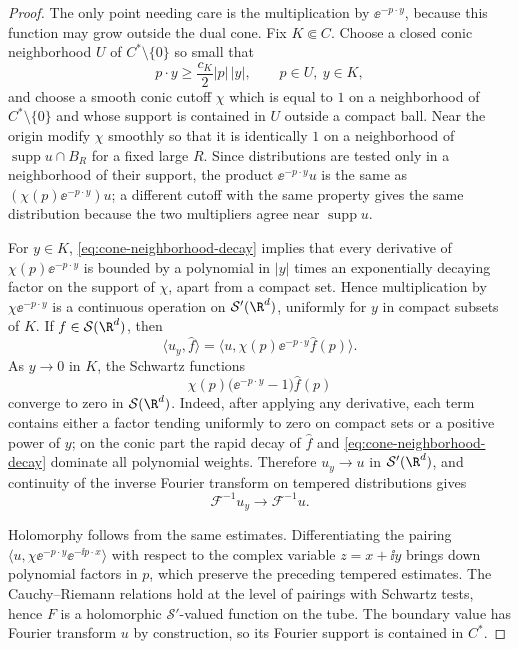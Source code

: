 \begin{proof}
The only point needing care is the multiplication by \(\ee^{-p\cdot y}\),
because this function may grow outside the dual cone.  Fix
\(K\Subset C\).  Choose a closed conic neighborhood \(U\) of
\(C^*\setminus\{0\}\) so small that
\begin{equation}
  p\cdot y\ge \frac{c_K}{2}|p|\,|y|,
  \qquad p\in U,\ y\in K ,
  \label{eq:cone-neighborhood-decay}
\end{equation}
and choose a smooth conic cutoff \(\chi\) which is equal to \(1\) on a
neighborhood of \(C^*\setminus\{0\}\) and whose support is contained in \(U\)
outside a compact ball.  Near the origin modify \(\chi\) smoothly so that it is
identically \(1\) on a neighborhood of \(\operatorname{supp}u\cap B_R\) for a
fixed large \(R\).  Since distributions are tested only in a neighborhood of
their support, the product \(\ee^{-p\cdot y}u\) is the same as
\((\chi(p)\ee^{-p\cdot y})u\); a different cutoff with the same property gives
the same distribution because the two multipliers agree near
\(\operatorname{supp}u\).

For \(y\in K\), \eqref{eq:cone-neighborhood-decay} implies that every
derivative of \(\chi(p)\ee^{-p\cdot y}\) is bounded by a polynomial in
\(|y|\) times an exponentially decaying factor on the support of \(\chi\),
apart from a compact set.  Hence multiplication by
\(\chi\ee^{-p\cdot y}\) is a continuous operation on \(\mathcal S'(\R^d)\),
uniformly for \(y\) in compact subsets of \(K\).  If \(f\in\mathcal S(\R^d)\),
then
\[
  \langle u_y,\widehat f\rangle
  =
  \langle u,\chi(p)\ee^{-p\cdot y}\widehat f(p)\rangle .
\]
As \(y\to0\) in \(K\), the Schwartz functions
\[
  \chi(p)\bigl(\ee^{-p\cdot y}-1\bigr)\widehat f(p)
\]
converge to zero in \(\mathcal S(\R^d)\).  Indeed, after applying any
derivative, each term contains either a factor tending uniformly to zero on
compact sets or a positive power of \(y\); on the conic part the rapid decay of
\(\widehat f\) and \eqref{eq:cone-neighborhood-decay} dominate all polynomial
weights.  Therefore \(u_y\to u\) in \(\mathcal S'(\R^d)\), and continuity of
the inverse Fourier transform on tempered distributions gives
\[
  \mathcal F^{-1}u_y\to\mathcal F^{-1}u .
\]

Holomorphy follows from the same estimates.  Differentiating the pairing
\(\langle u,\chi\ee^{-p\cdot y}\ee^{-\ii p\cdot x}\rangle\) with respect to
the complex variable \(z=x+\ii y\) brings down polynomial factors in \(p\),
which preserve the preceding tempered estimates.  The Cauchy--Riemann
relations hold at the level of pairings with Schwartz tests, hence
\(F\) is a holomorphic \(\mathcal S'\)-valued function on the tube.  The
boundary value has Fourier transform \(u\) by construction, so its Fourier
support is contained in \(C^*\).
\end{proof}

